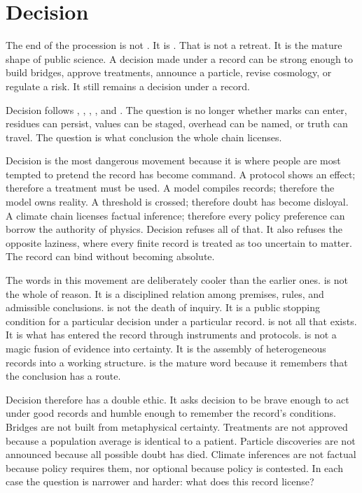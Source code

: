 \chapter{Decision}
\label{chap:decision}

\begin{chapteressay}
The end of the procession is not . It is . That is
not a retreat. It is the mature shape of public science. A decision made under
a record can be strong enough to build bridges, approve treatments, announce a
particle, revise cosmology, or regulate a risk. It still remains a decision
under a record.

Decision follows , , ,
, and . The question is no longer whether marks
can enter, residues can persist, values can be staged, overhead can be named,
or truth can travel. The question is what conclusion the whole chain licenses.

Decision is the most dangerous movement because it is where people are most
tempted to pretend the record has become command. A protocol shows an effect;
therefore a treatment must be used. A model compiles records; therefore the
model owns reality. A threshold is crossed; therefore doubt has become
disloyal. A climate chain licenses factual inference; therefore every policy
preference can borrow the authority of physics. Decision refuses all of
that. It also refuses the opposite laziness, where every finite record is
treated as too uncertain to matter. The record can bind without becoming
absolute.

The words in this movement are deliberately cooler than the earlier ones.
 is not the whole of reason. It is a disciplined relation among
premises, rules, and admissible conclusions.  is not the death of
inquiry. It is a public stopping condition for a particular decision under a
particular record.  is not all that exists. It is what has
entered the record through instruments and protocols.  is not
a magic fusion of evidence into certainty. It is the assembly of heterogeneous
records into a working structure.  is the mature word because
it remembers that the conclusion has a route.

Decision therefore has a double ethic. It asks decision to be brave enough
to act under good records and humble enough to remember the record's
conditions. Bridges are not built from metaphysical certainty. Treatments are
not approved because a population average is identical to a patient. Particle
discoveries are not announced because all possible doubt has died. Climate
inferences are not factual because policy requires them, nor optional because
policy is contested. In each case the question is narrower and harder: what
does this record license?


\end{chapteressay}
